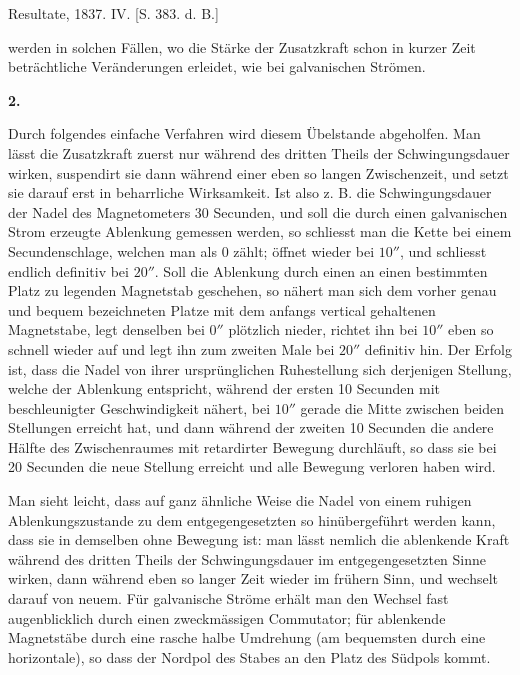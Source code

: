 \expandafter\def\csname HistoricalNoteText404\endcsname{Resultate, 1837. IV. [S. 383. d. B.]}
\renewcommand{\Article}[1]{\par\medskip\Needspace{4\baselineskip}\pdfbookmark[1]{#1.}{ablenkungen-art-#1}\centerline{\textbf{#1.}}\nobreak\smallskip}%
\par\clearpage
{}
\noindent werden in solchen Fällen, wo die Stärke der Zusatzkraft schon in kurzer Zeit beträchtliche Veränderungen erleidet, wie bei galvanischen Strömen.

\Article{2}
Durch folgendes einfache Verfahren wird diesem Übelstande abgeholfen. Man lässt die Zusatzkraft zuerst nur während des dritten Theils der Schwingungsdauer wirken, suspendirt sie dann während einer eben so langen Zwischenzeit, und setzt sie darauf erst in beharrliche Wirksamkeit. Ist also z. B. die Schwingungsdauer der Nadel des Magnetometers 30 Secunden, und soll die durch einen galvanischen Strom erzeugte Ablenkung gemessen werden, so schliesst man die Kette bei einem Secundenschlage, welchen man als 0 zählt; öffnet wieder bei $10''$, und schliesst endlich definitiv bei $20''$. Soll die Ablenkung durch einen an einen bestimmten Platz zu legenden Magnetstab geschehen, so nähert man sich dem vorher genau und bequem bezeichneten Platze mit dem anfangs vertical gehaltenen Magnetstabe, legt denselben bei $0''$ plötzlich nieder, richtet ihn bei $10''$ eben so schnell wieder auf und legt ihn zum zweiten Male bei $20''$ definitiv hin. Der Erfolg ist, dass die Nadel von ihrer ursprünglichen Ruhestellung sich derjenigen Stellung, welche der Ablenkung entspricht, während der ersten 10 Secunden mit beschleunigter Geschwindigkeit nähert, bei $10''$ gerade die Mitte zwischen beiden Stellungen erreicht hat, und dann während der zweiten 10 Secunden die andere Hälfte des Zwischenraumes mit retardirter Bewegung durchläuft, so dass sie bei 20 Secunden die neue Stellung erreicht und alle Bewegung verloren haben wird.

Man sieht leicht, dass auf ganz ähnliche Weise die Nadel von einem ruhigen Ablenkungszustande zu dem entgegengesetzten so hinübergeführt werden kann, dass sie in demselben ohne Bewegung ist: man lässt nemlich die ablenkende Kraft während des dritten Theils der Schwingungsdauer im entgegengesetzten Sinne wirken, dann während eben so langer Zeit wieder im frühern Sinn, und wechselt darauf von neuem. Für galvanische Ströme erhält man den Wechsel fast augenblicklich durch einen zweckmässigen Commutator; für ablenkende Magnetstäbe durch eine rasche halbe Umdrehung (am bequemsten durch eine horizontale), so dass der Nordpol des Stabes an den Platz des Südpols kommt.

